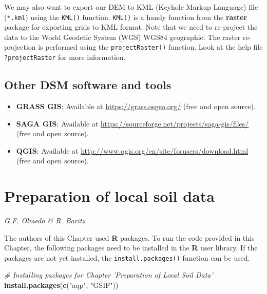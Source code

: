 \documentclass[10pt,b5paper,]{book}
\newenvironment{Shaded}{\begin{snugshade}}{\end{snugshade}}
\newcommand{\CommentTok}[1]{\textcolor[rgb]{0.56,0.35,0.01}{\textit{#1}}}
\newcommand{\KeywordTok}[1]{\textcolor[rgb]{0.13,0.29,0.53}{\textbf{#1}}}
\newcommand{\NormalTok}[1]{#1}
\newcommand{\StringTok}[1]{\textcolor[rgb]{0.31,0.60,0.02}{#1}}
\providecommand{\tightlist}{%
  \setlength{\itemsep}{0pt}\setlength{\parskip}{0pt}}
\theoremstyle{definition}
\theoremstyle{definition}
\theoremstyle{definition}
\theoremstyle{remark}
\begin{document}
We may also want to export our DEM to KML (Keyhole Markup Language) file
(\texttt{*.kml}) using the \texttt{KML()} function. \texttt{KML()} is a
handy function from the \textbf{raster} package for exporting grids to
KML format. Note that we need to re-project the data to the World
Geodetic System (WGS) WGS84 geographic. The raster re-projection is
performed using the \texttt{projectRaster()} function. Look at the help
file \texttt{?projectRaster} for more information.

\hypertarget{other-dsm-software-and-tools}{%
\section{Other DSM software and
tools}\label{other-dsm-software-and-tools}}

\begin{itemize}
\tightlist
\item
  \textbf{GRASS GIS}: Available at \url{https://grass.osgeo.org/} (free
  and open source).
\item
  \textbf{SAGA GIS}: Available at
  \url{https://sourceforge.net/projects/saga-gis/files/} (free and open
  source).
\item
  \textbf{QGIS}: Available at
  \url{http://www.qgis.org/en/site/forusers/download.html} (free and
  open source).
\end{itemize}

\hypertarget{preparation}{%
\chapter{Preparation of local soil data}\label{preparation}}

\emph{G.F. Olmedo \& R. Baritz}

The authors of this Chapter used \textbf{R} packages. To run the code
provided in this Chapter, the following packages need to be installed in
the \textbf{R} user library. If the packages are not yet installed, the
\texttt{install.packages()} function can be used.

\begin{Shaded}
\begin{Highlighting}[]
\CommentTok{# Installing packages for Chapter 'Preparation of Local Soil Data'}
\KeywordTok{install.packages}\NormalTok{(}\KeywordTok{c}\NormalTok{(}\StringTok{"aqp"}\NormalTok{, }\StringTok{"GSIF"}\NormalTok{))}
\end{Highlighting}
\end{Shaded}
\end{document}
